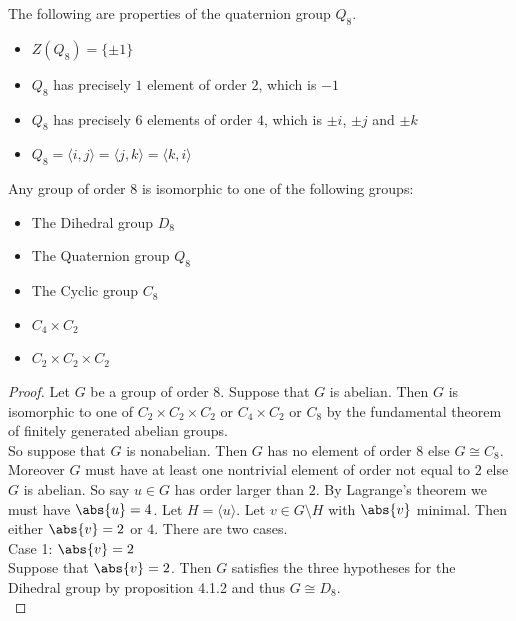 \documentclass[a4paper]{article}
\begin{document}
\begin{prp}{}{} The following are properties of the quaternion group $Q_8$. 
\begin{itemize}
\item $Z(Q_8)=\{\pm 1\}$
\item $Q_8$ has precisely $1$ element of order $2$, which is $-1$
\item $Q_8$ has precisely $6$ elements of order $4$, which is $\pm i$, $\pm j$ and $\pm k$
\item $Q_8=\langle i,j\rangle=\langle j, k\rangle=\langle k, i\rangle$
\end{itemize}
\end{prp}

\begin{thm}{}{} Any group of order $8$ is isomorphic to one of the following groups: 
\begin{itemize}
\item The Dihedral group $D_8$
\item The Quaternion group $Q_8$
\item The Cyclic group $C_8$
\item $C_4\times C_2$
\item $C_2\times C_2\times C_2$
\end{itemize} 
\begin{proof}
Let $G$ be a group of order $8$. Suppose that $G$ is abelian. Then $G$ is isomorphic to one of $C_2\times C_2\times C_2$ or $C_4\times C_2$ or $C_8$ by the fundamental theorem of finitely generated abelian groups. \\
So suppose that $G$ is nonabelian. Then $G$ has no element of order $8$ else $G\cong C_8$. Moreover $G$ must have at least one nontrivial element of order not equal to $2$ else $G$ is abelian. So say $u\in G$ has order larger than $2$. By Lagrange's theorem we must have $\abs{u}=4$. Let $H=\langle u\rangle$. Let $v\in G\setminus H$ with $\abs{v}$ minimal. Then either $\abs{v}=2$ or $4$. There are two cases. \\

Case 1: $\abs{v}=2$\\
Suppose that $\abs{v}=2$. Then $G$ satisfies the three hypotheses for the Dihedral group by proposition 4.1.2 and thus $G\cong D_8$. \\


\end{proof}
\end{thm}
\end{document}
